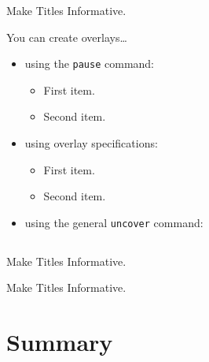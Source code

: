 \documentclass{beamer}
\begin{document}
\begin{frame}{Make Titles Informative.}

  You can create overlays\dots
  \begin{itemize}
  \item using the \texttt{pause} command:
    \begin{itemize}
    \item
      First item.
      \pause
    \item    
      Second item.
    \end{itemize}
  \item
    using overlay specifications:
    \begin{itemize}
    \item<3->
      First item.
    \item<4->
      Second item.
    \end{itemize}
  \item
    using the general \texttt{uncover} command:
    \begin{itemize}
    \end{itemize}
  \end{itemize}
\end{frame}


\subsection{}

\begin{frame}{Make Titles Informative.}
\end{frame}

\begin{frame}{Make Titles Informative.}
\end{frame}



\section*{Summary}
\end{document}
